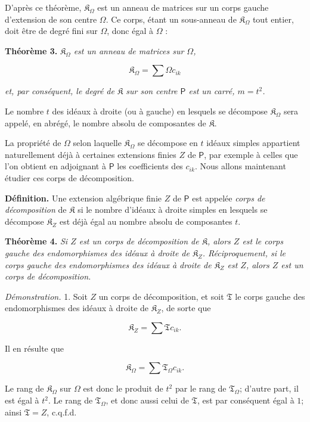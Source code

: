 D'après ce théorème, \(\mathfrak K_\Omega\) est un anneau de matrices sur un corps gauche d'extension de son centre \(\Omega\). Ce corps, étant un sous-anneau de \(\mathfrak K_\Omega\) tout entier, doit être de degré fini sur \(\Omega\), donc égal à \(\Omega\) :

\textbf{Théorème 3.} \emph{\(\mathfrak K_\Omega\) est un anneau de matrices sur \(\Omega\),}

\[
\mathfrak K_\Omega=\sum\Omega c_{ik}
\]

\emph{et, par conséquent, le degré de \(\mathfrak K\) sur son centre \(\mathsf P\) est un carré, \(m=t^2\).}

Le nombre \(t\) des idéaux à droite (ou à gauche) en lesquels se décompose \(\mathfrak K_\Omega\) sera appelé, en abrégé, le nombre absolu de composantes de \(\mathfrak K\).

La propriété de \(\Omega\) selon laquelle \(\mathfrak K_\Omega\) se décompose en \(t\) idéaux simples appartient naturellement déjà à certaines extensions finies \(Z\) de \(\mathsf P\), par exemple à celles que l'on obtient en adjoignant à \(\mathsf P\) les coefficients des \(c_{ik}\). Nous allons maintenant étudier ces corps de décomposition.

\textbf{Définition.} Une extension algébrique finie \(Z\) de \(\mathsf P\) est appelée \emph{corps de décomposition} de \(\mathfrak K\) si le nombre d'idéaux à droite simples en lesquels se décompose \(\mathfrak K_Z\) est déjà égal au nombre absolu de composantes \(t\).

\textbf{Théorème 4.} \emph{Si \(Z\) est un corps de décomposition de \(\mathfrak K\), alors \(Z\) est le corps gauche des endomorphismes des idéaux à droite de \(\mathfrak K_Z\). Réciproquement, si le corps gauche des endomorphismes des idéaux à droite de \(\mathfrak K_Z\) est \(Z\), alors \(Z\) est un corps de décomposition.}

\emph{Démonstration.} 1. Soit \(Z\) un corps de décomposition, et soit \(\mathfrak T\) le corps gauche des endomorphismes des idéaux à droite de \(\mathfrak K_Z\), de sorte que

\[
\mathfrak K_Z=\sum\mathfrak T c_{ik}.
\]

Il en résulte que

\[
\mathfrak K_\Omega=\sum\mathfrak T_\Omega c_{ik}.
\]

Le rang de \(\mathfrak K_\Omega\) sur \(\Omega\) est donc le produit de \(t^2\) par le rang de \(\mathfrak T_\Omega\); d'autre part, il est égal à \(t^2\). Le rang de \(\mathfrak T_\Omega\), et donc aussi celui de \(\mathfrak T\), est par conséquent égal à \(1\); ainsi \(\mathfrak T=Z\), c.q.f.d.

